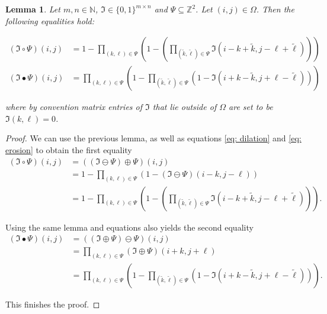 \documentclass[a4paper,12pt]{article}
\theoremstyle{plain}
\newtheorem{lemma}[theorem]{Lemma}
\theoremstyle{definition}
\numberwithin{equation}{section}
\begin{document}
\begin{lemma}
	Let $m, n \in \mathbb{N}$, $\mathfrak{I} \in \{ 0, 1 \}^{m \times n}$ and $\Psi \subseteq \mathbb{Z}^2$. Let $(i, j) \in \Omega$. Then the following equalities hold:
	\begin{samepage}
		\begin{align}
			(\mathfrak{I} \circ \Psi)(i, j) &= 1 - \prod_{(k, \ell) \in \Psi} \left( 1 - \left( \prod_{(\tilde{k}, \tilde{\ell}) \in \Psi} \mathfrak{I}(i - k + \tilde{k}, j - \ell + \tilde{\ell}) \right) \right) \label{eq: opening} \\
			(\mathfrak{I} \bullet \Psi)(i, j) &= \prod_{(k, \ell) \in \Psi} \left( 1 - \prod_{(\tilde{k}, \tilde{\ell}) \in \Psi} ( 1 - \mathfrak{I}(i + k - \tilde{k}, j + \ell - \tilde{\ell}) ) \right) \label{eq: closing}
		\end{align}
	\end{samepage}
	where by convention matrix entries of $\mathfrak{I}$ that lie outside of $\Omega$ are set to be $\mathfrak{I}(k, \ell) = 0$.
\end{lemma}
\begin{proof}
	We can use the previous lemma, as well as equations \eqref{eq: dilation} and \eqref{eq: erosion} to obtain the first equality
	\begin{align*}
		(\mathfrak{I} \circ \Psi)(i, j) &= ((\mathfrak{I} \ominus \Psi) \oplus \Psi)(i, j) \\
		&= 1 - \prod_{(k, \ell) \in \Psi} ( 1 - (\mathfrak{I} \ominus \Psi)(i - k, j - \ell) ) \\
		&= 1 - \prod_{(k, \ell) \in \Psi} \left( 1 - \left( \prod_{(\tilde{k}, \tilde{\ell}) \in \Psi} \mathfrak{I}(i - k + \tilde{k}, j - \ell + \tilde{\ell}) \right) \right).
	\end{align*}
	
	Using the same lemma and equations also yields the second equality
	\begin{align*}
		(\mathfrak{I} \bullet \Psi)(i, j) &= ((\mathfrak{I} \oplus \Psi) \ominus \Psi)(i, j) \\
		&= \prod_{(k, \ell) \in \Psi} (\mathfrak{I} \oplus \Psi)(i + k, j + \ell) \\
		&= \prod_{(k, \ell) \in \Psi} \left( 1 - \prod_{(\tilde{k}, \tilde{\ell}) \in \Psi} ( 1 - \mathfrak{I}(i + k - \tilde{k}, j + \ell - \tilde{\ell}) ) \right).
	\end{align*}
	
	This finishes the proof.
\end{proof}
\end{document}
